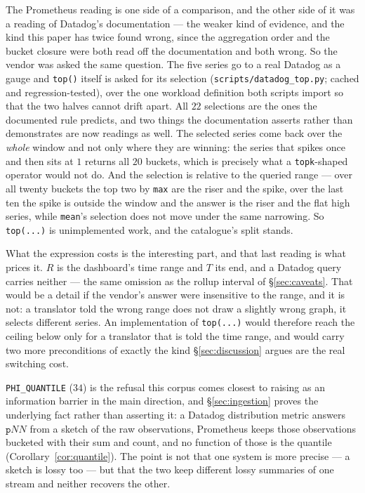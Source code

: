The Prometheus reading is one side of a comparison, and the other side of it was a
reading of Datadog's documentation --- the weaker kind of evidence, and the kind this
paper has twice found wrong, since the aggregation order and the bucket closure were both
read off the documentation and both wrong. So the vendor was asked the same question. The five series
go to a real Datadog as a gauge and \texttt{top()} itself is asked for its selection
(\texttt{scripts\slash datadog\_top.py}; cached and regression-tested), over the one
workload definition both scripts import so that the two halves cannot drift apart. All
$22$ selections are the ones the documented rule predicts, and two things the
documentation asserts rather than demonstrates are now readings as well. The selected
series come back over the \emph{whole} window and not only where they are winning: the
series that spikes once and then sits at $1$ returns all $20$ buckets, which is precisely
what a \texttt{topk}-shaped operator would not do. And the selection is relative to the
queried range --- over all twenty buckets the top two by \texttt{max} are the riser and
the spike, over the last ten the spike is outside the window and the answer is the riser
and the flat high series, while \texttt{mean}'s selection does not move under the same
narrowing. So \texttt{top(...)} is unimplemented work, and the catalogue's split stands.

What the expression costs is the interesting part, and that last reading is what prices
it. $R$ is the dashboard's time range and $T$ its end, and a Datadog query carries
neither --- the same omission as the rollup interval of \S\ref{sec:caveats}. That would
be a detail if the vendor's answer were insensitive to the range, and it is not: a
translator told the wrong range does not draw a slightly wrong graph, it selects
different series. An implementation of \texttt{top(...)} would therefore
reach the ceiling below only for a translator that is told the time range, and would
carry two more preconditions of exactly the kind \S\ref{sec:discussion} argues are the
real switching cost.

\texttt{PHI\_QUANTILE} ($34$) is the refusal this corpus comes closest to raising as an
information barrier in the main direction, and \S\ref{sec:ingestion} proves the
underlying fact rather than asserting it: a Datadog distribution metric answers
$\mathtt{p}NN$ from a sketch of the raw observations, Prometheus keeps those observations
bucketed with their sum and count, and no function of those is the quantile
(Corollary~\ref{cor:quantile}). The point is not that one system is more precise --- a
sketch is lossy too --- but that the two keep different lossy summaries of one stream and
neither recovers the other.

